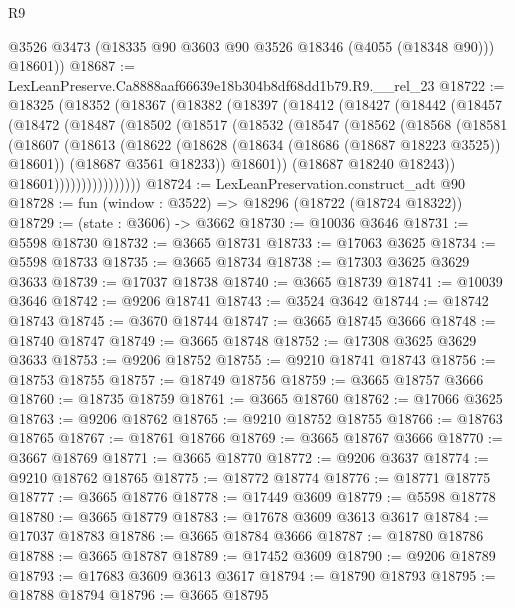 \begin{lexlean}{R9}
\begin{coremodule}
        @3526
        @3473
        (@18335 @90 @3603 @90 @3526 @18346 (@4055 (@18348 @90)))
        @18601))
@18687 := LexLeanPreserve.Ca8888aaf66639e18b304b8df68dd1b79.R9.__rel_23
@18722 := @18325
    (@18352
      (@18367
        (@18382
          (@18397
            (@18412
              (@18427
                (@18442
                  (@18457
                    (@18472
                      (@18487
                        (@18502
                          (@18517
                            (@18532
                              (@18547
                                (@18562
                                  (@18568
                                    (@18581
                                      (@18607
                                        (@18613
                                          (@18622
                                            (@18628 (@18634 (@18686 (@18687 @18223 @3525)) @18601))
                                            (@18687 @3561 @18233))
                                          @18601))
                                      (@18687 @18240 @18243))
                                    @18601))))))))))))))))
@18724 := LexLeanPreservation.construct_adt @90
@18728 := fun (window : @3522) => @18296 (@18722 (@18724 @18322))
@18729 := (state : @3606) -> @3662
@18730 := @10036 @3646
@18731 := @5598 @18730
@18732 := @3665 @18731
@18733 := @17063 @3625
@18734 := @5598 @18733
@18735 := @3665 @18734
@18738 := @17303 @3625 @3629 @3633
@18739 := @17037 @18738
@18740 := @3665 @18739
@18741 := @10039 @3646
@18742 := @9206 @18741
@18743 := @3524 @3642
@18744 := @18742 @18743
@18745 := @3670 @18744
@18747 := @3665 @18745 @3666
@18748 := @18740 @18747
@18749 := @3665 @18748
@18752 := @17308 @3625 @3629 @3633
@18753 := @9206 @18752
@18755 := @9210 @18741 @18743
@18756 := @18753 @18755
@18757 := @18749 @18756
@18759 := @3665 @18757 @3666
@18760 := @18735 @18759
@18761 := @3665 @18760
@18762 := @17066 @3625
@18763 := @9206 @18762
@18765 := @9210 @18752 @18755
@18766 := @18763 @18765
@18767 := @18761 @18766
@18769 := @3665 @18767 @3666
@18770 := @3667 @18769
@18771 := @3665 @18770
@18772 := @9206 @3637
@18774 := @9210 @18762 @18765
@18775 := @18772 @18774
@18776 := @18771 @18775
@18777 := @3665 @18776
@18778 := @17449 @3609
@18779 := @5598 @18778
@18780 := @3665 @18779
@18783 := @17678 @3609 @3613 @3617
@18784 := @17037 @18783
@18786 := @3665 @18784 @3666
@18787 := @18780 @18786
@18788 := @3665 @18787
@18789 := @17452 @3609
@18790 := @9206 @18789
@18793 := @17683 @3609 @3613 @3617
@18794 := @18790 @18793
@18795 := @18788 @18794
@18796 := @3665 @18795

\end{coremodule}
\end{lexlean}
